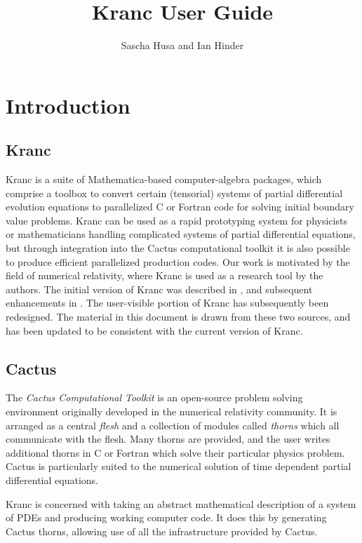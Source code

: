 \documentclass{report}
\title{Kranc User Guide}
\author{Sascha Husa and Ian Hinder}
\begin{document}
\maketitle
\tableofcontents
\chapter{Introduction}

\section{Kranc}
Kranc is a suite of Mathematica-based computer-algebra packages, which
comprise a toolbox to convert certain (tensorial) systems of partial
differential evolution equations to parallelized C or Fortran code for
solving initial boundary value problems.  Kranc can be used as a rapid
prototyping system for physicists or mathematicians handling
complicated systems of partial differential equations, but through
integration into the Cactus computational toolkit it is also possible
to produce efficient parallelized production codes.  Our work is
motivated by the field of numerical relativity, where Kranc is used as
a research tool by the authors.  The initial version of Kranc was
described in \cite{KrancPaper}, and subsequent enhancements in
\cite{IHPhDThesis}.  The user-visible portion of Kranc has
subsequently been redesigned.  The material in this document is drawn
from these two sources, and has been updated to be consistent with the
current version of Kranc.

\section{Cactus}

The {\em Cactus Computational Toolkit} is an open-source problem
solving environment originally developed in the numerical relativity
community.  It is arranged as a central {\em flesh} and a collection
of modules called {\em thorns} which all communicate with the
flesh. Many thorns are provided, and the user writes additional thorns
in C or Fortran which solve their particular physics problem.  Cactus
is particularly suited to the numerical solution of time dependent
partial differential equations.

Kranc is concerned with taking an abstract mathematical description of
a system of PDEs and producing working computer code.  It does this by
generating Cactus thorns, allowing use of all the infrastructure
provided by Cactus.
\end{document}
